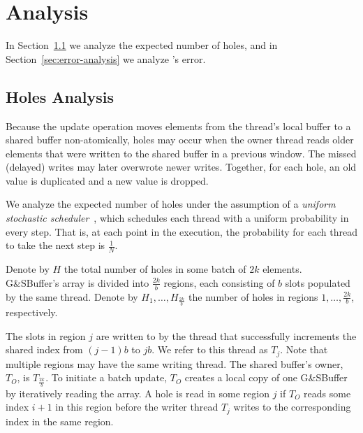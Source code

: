 \chapter{Analysis}
\label{chap:analysis}

In Section~\ref{sec:holes-analysis} we analyze the expected number of holes, and in Section~\ref{sec:error-analysis} we analyze \mysketch's error.

\section{Holes Analysis}
\label{sec:holes-analysis}

Because the update operation moves elements from the thread's local buffer to a shared buffer non-atomically, holes may occur when the owner thread reads older elements that were written to the shared buffer in a previous window. The missed (delayed) writes may later overwrote newer writes. Together, for each hole, an old value is duplicated and a new value is dropped.

We analyze the expected number of holes under the assumption of a \emph{uniform stochastic scheduler}~\cite{alistarh2016lock}, which schedules each thread with a uniform probability in every step. That is, at each point in the execution, the probability for each thread to take the next step is $\frac{1}{N}$.

Denote by $H$ the total number of holes in some batch of $2k$ elements. G\&SBuffer's array is divided into $\frac{2k}{b}$ regions, each consisting of $b$ slots populated by the same thread. Denote by $H_1,\dots, H_{\frac{2k}{b}}$ the number of holes in regions $1, \dots, \frac{2k}{b}$, respectively.

The slots in region $j$ are written to by the thread that successfully increments the shared index from $(j-1)b$ to $jb$. We refer to this thread as $T_j$. Note that multiple regions may have the same writing thread. The shared buffer's owner, $T_O$, is $T_{\frac{2k}{b}}$. To initiate a batch update, $T_O$ creates a local copy of one G\&SBuffer by iteratively reading the array. A hole is read in some region $j$ if $T_O$ reads some index $i+1$ in this region before the writer thread $T_j$ writes to the corresponding index in the same region.

